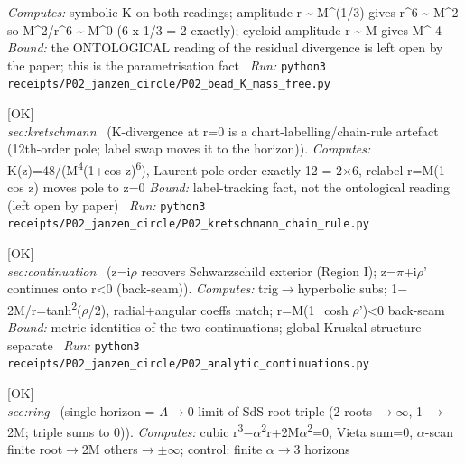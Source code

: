 \begin{description}
\emph{Computes:} symbolic K on both readings; amplitude r \textasciitilde{} M\textasciicircum{}(1/3) gives r\textasciicircum{}6 \textasciitilde{} M\textasciicircum{}2 so M\textasciicircum{}2/r\textasciicircum{}6 \textasciitilde{} M\textasciicircum{}0 (6 x 1/3 = 2 exactly); cycloid amplitude r \textasciitilde{} M gives M\textasciicircum{}-4
 \emph{Bound:} the ONTOLOGICAL reading of the residual divergence is left open by the paper; this is the parametrisation fact
\ \emph{Run:} \texttt{python3 receipts/P02\_janzen\_circle/P02\_bead\_K\_mass\_free.py}
\item[\label{rcpt:P02_kretschmann_chain_rule}\texttt{P02\_kretschmann\_chain\_rule}]\hfill\textsf{[OK]}\\
\textit{sec:kretschmann} \ (K-divergence at r=0 is a chart-labelling/chain-rule artefact (12th-order pole; label swap moves it to the horizon)). 
\emph{Computes:} K(z)=48/(M\textsuperscript{4}(1+cos z)\textsuperscript{6}), Laurent pole order exactly 12 = 2\ensuremath{\times}6, relabel r=M(1\ensuremath{-}cos z) moves pole to z=0
 \emph{Bound:} label-tracking fact, not the ontological reading (left open by paper)
\ \emph{Run:} \texttt{python3 receipts/P02\_janzen\_circle/P02\_kretschmann\_chain\_rule.py}
\item[\label{rcpt:P02_analytic_continuations}\texttt{P02\_analytic\_continuations}]\hfill\textsf{[OK]}\\
\textit{sec:continuation} \ (z=i\ensuremath{\rho} recovers Schwarzschild exterior (Region I); z=\ensuremath{\pi}+i\ensuremath{\rho}' continues onto r<0 (back-seam)). 
\emph{Computes:} trig\ensuremath{\to}hyperbolic subs; 1\ensuremath{-}2M/r=tanh\textsuperscript{2}(\ensuremath{\rho}/2), radial+angular coeffs match; r=M(1\ensuremath{-}cosh \ensuremath{\rho}')<0 back-seam
 \emph{Bound:} metric identities of the two continuations; global Kruskal structure separate
\ \emph{Run:} \texttt{python3 receipts/P02\_janzen\_circle/P02\_analytic\_continuations.py}
\item[\label{rcpt:P02_ring_lambda_limit}\texttt{P02\_ring\_lambda\_limit}]\hfill\textsf{[OK]}\\
\textit{sec:ring} \ (single horizon = \ensuremath{\Lambda}\ensuremath{\to}0 limit of SdS root triple (2 roots \ensuremath{\to}\ensuremath{\infty}, 1 \ensuremath{\to}2M; triple sums to 0)). 
\emph{Computes:} cubic r\textsuperscript{3}\ensuremath{-}\ensuremath{\alpha}\textsuperscript{2}r+2M\ensuremath{\alpha}\textsuperscript{2}=0, Vieta sum=0, \ensuremath{\alpha}-scan finite root\ensuremath{\to}2M others\ensuremath{\to}\ensuremath{\pm}\ensuremath{\infty}; control: finite \ensuremath{\alpha}\ensuremath{\to}3 horizons

\end{description}
